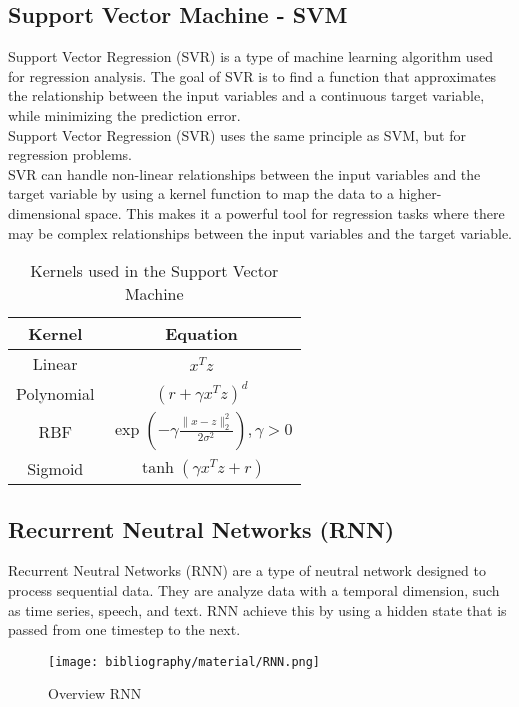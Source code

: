 \documentclass{ieeeojies}
\begin{document}
\subsection{Support Vector Machine - SVM}
Support Vector Regression (SVR) is a type of machine learning algorithm used for regression analysis. The goal of SVR is to find a function that approximates the relationship between the input variables and a continuous target variable, while minimizing the prediction error.\cite{b10} \\
Support Vector Regression (SVR) uses the same principle as SVM, but for regression problems.\cite{b10}\\
SVR can handle non-linear relationships between the input variables and the target variable by using a kernel function to map the data to a higher-dimensional space. This makes it a powerful tool for regression tasks where there may be complex relationships between the input variables and the target variable. \cite{b10}
\begin{table}[H]
\centering
\caption{Kernels used in the Support Vector Machine}
\begin{tabular}{|c|c|}
\hline
\textbf{Kernel} & \textbf{Equation} \\ \hline
Linear & ${x^T z}$ \\ \hline
Polynomial & $\left( r + \gamma {x^T z} \right)^d$ \\ \hline
RBF & $\exp \left( -\gamma \frac{\|x - z\|_2^2}{2\sigma^2} \right), \gamma > 0$ \\ \hline
Sigmoid & $\tanh \left( \gamma {x^T z} + r \right)$ \\ \hline
\end{tabular}
\end{table}

\subsection{Recurrent Neutral Networks (RNN)}
Recurrent Neutral Networks (RNN) are a type of neutral network designed to process sequential data. They are analyze data with a temporal dimension, such as time series, speech, and text. RNN achieve this by using a hidden state that is passed from one timestep to the next. 
\begin{figure}
    \centering
    \texttt{[image: bibliography/material/RNN.png]}
    \caption{Overview RNN}
\end{figure}
\\
\end{document}

